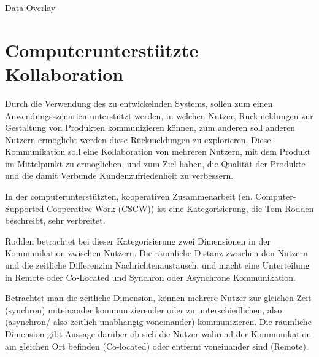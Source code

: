 


Data Overlay 




\section{Computerunterstützte Kollaboration}

Durch die Verwendung des zu entwickelnden Systems, sollen zum einen Anwendungsszenarien unterstützt werden, in welchen Nutzer, 
Rückmeldungen zur Gestaltung von Produkten kommunizieren können, zum anderen soll anderen Nutzern 
ermöglicht werden diese Rückmeldungen zu explorieren. Diese Kommunikation soll eine Kollaboration von 
mehreren Nutzern, mit dem Produkt im Mittelpunkt zu ermöglichen, 
und zum Ziel haben, die Qualität der Produkte und die damit Verbunde Kundenzufriedenheit zu verbessern.     

In der computerunterstützten, kooperativen Zusammenarbeit (en. Computer-Supported Cooperative Work (CSCW)) 
ist eine Kategorisierung, die Tom Rodden \cite[S.~2]{Rodden1992} beschreibt, sehr verbreitet.  

Rodden betrachtet bei dieser Kategorisierung zwei Dimensionen in der Kommunikation zwischen Nutzern. 
Die räumliche Distanz zwischen den Nutzern und die zeitliche Differenzim Nachrichtenaustausch, und macht eine 
Unterteilung in Remote oder Co-Located und Synchron oder Asynchrone Kommunikation.

Betrachtet man die zeitliche Dimension, können mehrere Nutzer zur gleichen Zeit (synchron) miteinander kommunizierender 
oder zu unterschiedlichen, also (asynchron/ also zeitlich unabhängig voneinander) kommunizieren. Die räumliche Dimension 
gibt Aussage darüber ob sich die Nutzer während der Kommunikation am gleichen Ort befinden (Co-located) oder entfernt voneinander sind (Remote). 

